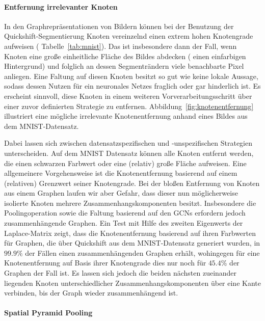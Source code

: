 \paragraph{Entfernung irrelevanter Knoten}
\label{entfernung_irrelevanter_knoten}

In den Graphrepräsentationen von Bildern können bei der Benutzung der Quickshift-Segmentierung Knoten vereinzelnd einen extrem hohen Knotengrade aufweisen (\vgl{} \zB{} Tabelle~\ref{tab:mnist}).
Das ist insbesondere dann der Fall, wenn Knoten eine große einheitliche Fläche des Bildes abdecken (\zB{} einen einfarbigen Hintergrund) und folglich an dessen Segmenträndern viele benachbarte Pixel anliegen.
Eine Faltung auf diesen Knoten besitzt so gut wie keine lokale Aussage, sodass dessen Nutzen für ein neuronales Netzes fraglich oder gar hinderlich ist.
Es erscheint sinnvoll, diese Knoten in einem weiteren Vorverarbeitungsschritt über einer zuvor definierten Strategie zu entfernen.
Abbildung~\ref{fig:knotenentfernung} illustriert eine mögliche irrelevante Knotenentfernung anhand eines Bildes aus dem \gls{MNIST}-Datensatz.

Dabei lassen sich zwischen datensatzspezifischen und -unspezifischen Strategien unterscheiden.
Auf dem \gls{MNIST} Datensatz können \zB{} alle Knoten entfernt werden, die einen schwarzen Farbwert oder eine (relativ) große Fläche aufweisen.
Eine allgemeinere Vorgehensweise ist die Knotenentfernung basierend auf einem (relativen) Grenzwert seiner Knotengrade.
Bei der bloßen Entfernung von Knoten aus einem Graphen laufen wir aber Gefahr, dass dieser nun möglicherweise isolierte Knoten \bzw{} mehrere Zusammenhangskomponenten besitzt.
Insbesondere die Poolingoperation sowie die Faltung basierend auf den \glspl{GCN} erfordern jedoch zusammenhängende Graphen.
Ein Test mit Hilfe des zweiten Eigenwerts der Laplace-Matrix zeigt, dass die Knotenentfernung basierend auf ihren Farbwerten für Graphen, die über Quickshift aus dem \gls{MNIST}-Datensatz generiert wurden, in $99.9\%$ der Fällen einen zusammenhängenden Graphen erhält, wohingegen für eine Knotenentfernung auf Basis ihrer Knotengrade dies nur noch für $45.4\%$ der Graphen der Fall ist.
Es lassen sich jedoch die beiden nächsten zueinander liegenden Knoten unterschiedlicher Zusammenhangskomponenten über eine Kante verbinden, bis der Graph wieder zusammenhängend ist.

\paragraph{Spatial Pyramid Pooling}
\label{spatial_pyramid_pooling}

